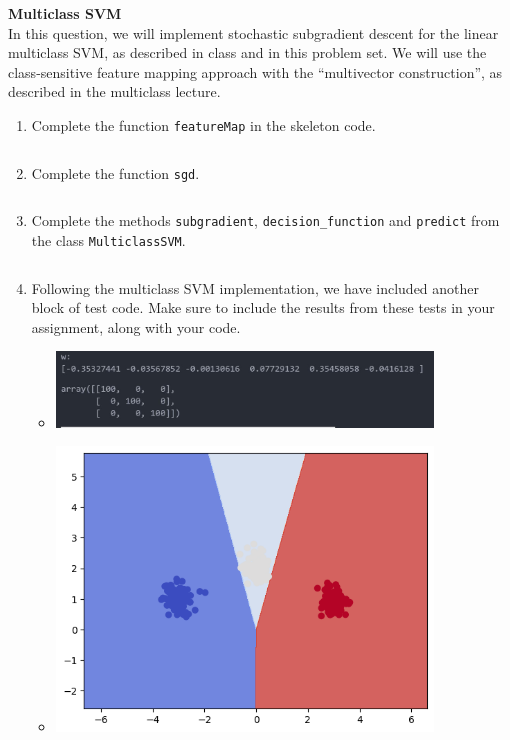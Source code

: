 \documentclass{article}
\newcommand{\nyuparagraph}[1]{\vspace{0.3cm}\textcolor{nyupurple}{\bf \large #1}\\}
\theoremstyle{plain}
\theoremstyle{definition}
\begin{document}
\nyuparagraph{Multiclass SVM}

In this question, we will implement stochastic subgradient descent
for the linear multiclass SVM, as described in class and in this
problem set. We will use the class-sensitive feature mapping approach
with the ``multivector construction'', as described in the multiclass lecture.
\begin{enumerate}
  \setcounter{enumi}{\value{saveenum}}
\item Complete the function \texttt{featureMap} in the skeleton code.
\begin{itemize}
    \color{blue}
             \inputminted[firstline=173, lastline=185, breaklines=True]{python}{hw_5.py}
\end{itemize}

\item Complete the function \texttt{sgd}.
\begin{itemize}
    \color{blue}
               \inputminted[firstline=186, lastline=209, breaklines=True]{python}{hw_5.py}
\end{itemize}

\item Complete the methods \texttt{subgradient}, \texttt{decision\_function} and \texttt{predict} from the class \texttt{MulticlassSVM}. 
\begin{itemize}
    \color{blue}
               \inputminted[firstline=211, lastline=291, breaklines=True]{python}{hw_5.py}
\end{itemize}

\item Following the multiclass
SVM implementation, we have included another block of test code. Make
sure to include the results from these tests in your assignment, along
with your code. 
\begin{itemize}
    \color{blue}
    \item 

\includegraphics[width=10cm]{homework/homework_5/immages/q2_1.jpg}\item 
\includegraphics[width=10cm]{homework/homework_5/immages/q2_2.png}
\end{itemize}
\setcounter{saveenum}{\value{enumi}}
\end{enumerate}
\end{document}
